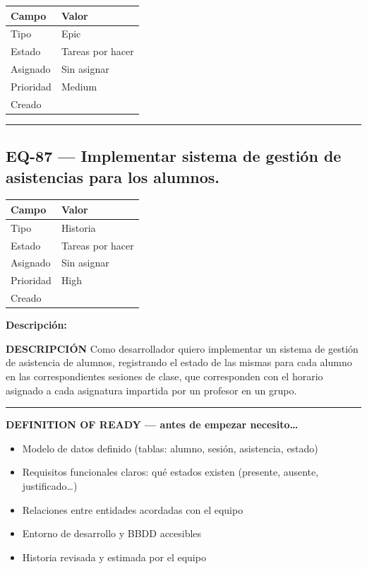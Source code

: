 \documentclass[
  spanish,
  11pt,
]{report}
\newcounter{none} %
\providecommand{\tightlist}{%
  \setlength{\itemsep}{0pt}\setlength{\parskip}{0pt}}
\begin{document}
{\def\LTcaptype{none} %
\begin{longtable}[]{@{}ll@{}}
\toprule\noalign{}
Campo & Valor \\
\midrule\noalign{}
\endhead
\bottomrule\noalign{}
\endlastfoot
Tipo & Epic \\
Estado & Tareas por hacer \\
Asignado & Sin asignar \\
Prioridad & Medium \\
Creado & \\
\end{longtable}
}

\begin{center}\rule{0.5\linewidth}{0.5pt}\end{center}

\subsection{EQ-87 --- Implementar sistema de gestión de asistencias para
los
alumnos.}\label{eq-87-implementar-sistema-de-gestiuxf3n-de-asistencias-para-los-alumnos.}

{\def\LTcaptype{none} %
\begin{longtable}[]{@{}ll@{}}
\toprule\noalign{}
Campo & Valor \\
\midrule\noalign{}
\endhead
\bottomrule\noalign{}
\endlastfoot
Tipo & Historia \\
Estado & Tareas por hacer \\
Asignado & Sin asignar \\
Prioridad & High \\
Creado & \\
\end{longtable}
}

\textbf{Descripción:}

\textbf{DESCRIPCIÓN} Como desarrollador quiero implementar un sistema de
gestión de asistencia de alumnos, registrando el estado de las mismas
para cada alumno en las correspondientes sesiones de clase, que
corresponden con el horario asignado a cada asignatura impartida por un
profesor en un grupo.

\begin{center}\rule{0.5\linewidth}{0.5pt}\end{center}

\textbf{DEFINITION OF READY --- antes de empezar necesito\ldots{}}

\begin{itemize}
\tightlist
\item
  Modelo de datos definido (tablas: alumno, sesión, asistencia, estado)
\item
  Requisitos funcionales claros: qué estados existen (presente, ausente,
  justificado\ldots)
\item
  Relaciones entre entidades acordadas con el equipo
\item
  Entorno de desarrollo y BBDD accesibles
\item
  Historia revisada y estimada por el equipo
\end{itemize}
\end{document}
